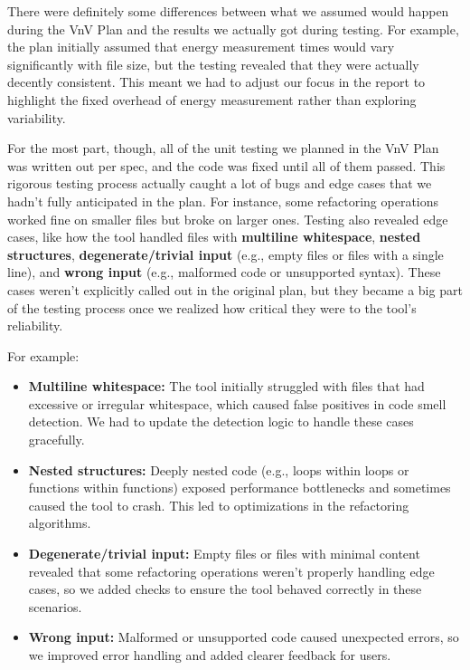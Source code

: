 \documentclass[12pt, titlepage]{article}
\begin{document}
\begin{itemize}
    There were definitely some differences between what we assumed
    would happen during
    the VnV Plan and the results we actually got during testing. For
    example, the plan initially assumed that
    energy measurement times would vary significantly with file size, but the
    testing revealed that they were actually decently consistent. This meant we
    had to adjust our focus in the report to highlight the fixed
    overhead of energy
    measurement rather than exploring variability.

    For the most part, though, all of the unit testing we planned in
    the VnV Plan was
    written out per spec, and the code was fixed until all of them passed. This
    rigorous testing process actually caught a lot of bugs and edge
    cases that we
    hadn't fully anticipated in the plan. For instance, some
    refactoring operations
    worked fine on smaller files but broke on larger ones. Testing
    also revealed edge cases,
    like how the tool handled files with \textbf{multiline
    whitespace}, \textbf{nested structures},
    \textbf{degenerate/trivial input} (e.g., empty files or files
    with a single line), and
    \textbf{wrong input} (e.g., malformed code or unsupported
    syntax). These cases weren't
    explicitly called out in the original plan, but they became a big
    part of the testing process
    once we realized how critical they were to the tool's reliability.

    For example:
    \begin{itemize}
      \item \textbf{Multiline whitespace:} The tool initially
        struggled with files that had excessive or irregular
        whitespace, which caused false positives in code smell
        detection. We had to update the detection logic to handle
        these cases gracefully.
      \item \textbf{Nested structures:} Deeply nested code (e.g.,
        loops within loops or functions within functions) exposed
        performance bottlenecks and sometimes caused the tool to
        crash. This led to optimizations in the refactoring algorithms.
      \item \textbf{Degenerate/trivial input:} Empty files or files
        with minimal content revealed that some refactoring
        operations weren't properly handling edge cases, so we added
        checks to ensure the tool behaved correctly in these scenarios.
      \item \textbf{Wrong input:} Malformed or unsupported code
        caused unexpected errors, so we improved error handling and
        added clearer feedback for users.
    \end{itemize}


\end{itemize}
\end{document}
